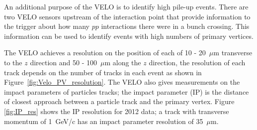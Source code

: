 

An additional purpose of the VELO is to identify high pile-up events. There are two VELO sensors upstream of the interaction point that provide information to the trigger about how many $pp$ interactions there were in a bunch crossing. This information can be used to identify events with high numbers of primary vertices. %

The VELO achieves a resolution on the position of each of 10 - 20~$\mu$m transverse to the $z$ direction and 50 - 100~$\mu$m along the $z$ direction, the resolution of each track depends on the number of tracks in each event as shown in Figure~\ref{fig:Velo_PV_resolution}. The VELO also gives measurements on the impact parameters of particles tracks; the impact parameter (IP) is the distance of closest approach between a particle track and the primary vertex. Figure \ref{fig:IP_res} shows the IP resolution for 2012 data; a track with transverse momentum of 1~GeV/c has an impact parameter resolution of 35~$\mu$m. 



